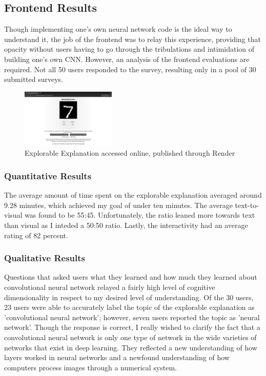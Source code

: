 \documentclass[10pt,twocolumn]{article}
\begin{document}
\subsection{Frontend Results}
Though implementing one's own neural network code is the ideal way to understand it, the job of the frontend was to relay this experience, providing that opacity without users having to go through the tribulations and intimidation of building one's own CNN. However, an analysis of the frontend evaluations are required. Not all 50 users responded to the survey, resulting only in a pool of 30 submitted surveys. 
\begin{figure}[h]
\caption{Explorable Explanation accessed online, published through Render}
\centering
\includegraphics[width=0.4\textwidth]{./Images/ExampleScreenShot.png}
\end{figure}
\subsubsection{Quantitative Results}
The average amount of time spent on the explorable explanation averaged around 9.28 minutes, which achieved my goal of under ten minutes. The average text-to-visual was found to be 55:45. Unfortunately, the ratio leaned more towards text than visual as I inteded a 50:50 ratio. Lastly, the interactivity had an average rating of 82 percent. 
\subsubsection{Qualitative Results}
Questions that asked users what they learned and how much they learned about convolutional neural network relayed a fairly high level of cognitive dimensionality in respect to my desired level of understanding. Of the 30 users, 23 users were able to accurately label the topic of the explorable explanation as 'convolutional neural network'; however, seven users reported the topic as 'neural network'. Though the response is correct, I really wished to clarify the fact that a convolutional neural network is only one type of network in the wide varieties of networks that exist in deep learning. They reflected a new understanding of how layers worked in neural networks and a newfound understanding of how computers process images through a numerical system. 
\end{document}
